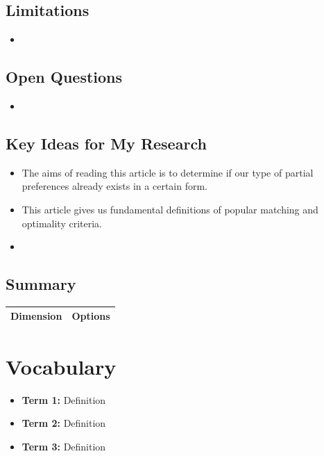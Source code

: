\documentclass[12pt,a4paper]{article}
\begin{document}
\subsection*{Limitations}
\begin{itemize}
    \item 
\end{itemize}

\subsection*{Open Questions}
\begin{itemize}
    \item 
\end{itemize}

\subsection*{Key Ideas for My Research}
\label{subsec:relevance5}
\begin{itemize}
    \item The aims of reading this article is to determine if our type of partial preferences already exists in a certain form.
    \item This article gives us fundamental definitions of popular matching and optimality criteria.
    \item  
\end{itemize}
\subsection*{Summary}

\begin{center}
\begin{tabular}{ll}
\toprule
\textbf{Dimension} & \textbf{Options} \\
\midrule


\bottomrule
\end{tabular}
\end{center}


\newpage



\section{Vocabulary}
\begin{itemize}
    \item \textbf{Term 1:} Definition
    \item \textbf{Term 2:} Definition
    \item \textbf{Term 3:} Definition
\end{itemize}
\end{document}

